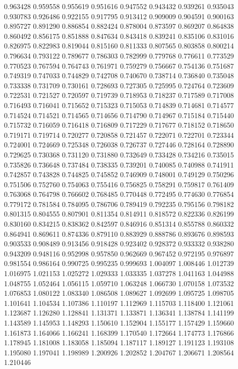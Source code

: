 0.963428
0.959558
0.955619
0.951616
0.947552
0.943432
0.939261
0.935043
0.930783
0.926486
0.922155
0.917795
0.913412
0.909009
0.904591
0.900163
0.895727
0.891290
0.886854
0.882424
0.878004
0.873597
0.869207
0.864838
0.860492
0.856175
0.851888
0.847634
0.843418
0.839241
0.835106
0.831016
0.826975
0.822983
0.819044
0.815160
0.811333
0.807565
0.803858
0.800214
0.796634
0.793122
0.789677
0.786303
0.782999
0.779768
0.776611
0.773529
0.770523
0.767594
0.764743
0.761971
0.759279
0.756667
0.754136
0.751687
0.749319
0.747033
0.744829
0.742708
0.740670
0.738714
0.736840
0.735048
0.733338
0.731709
0.730161
0.728693
0.727305
0.725995
0.724764
0.723609
0.722531
0.721527
0.720597
0.719739
0.718953
0.718237
0.717589
0.717008
0.716493
0.716041
0.715652
0.715323
0.715053
0.714839
0.714681
0.714577
0.714524
0.714521
0.714565
0.714656
0.714790
0.714967
0.715184
0.715440
0.715732
0.716059
0.716418
0.716809
0.717229
0.717677
0.718152
0.718650
0.719171
0.719714
0.720277
0.720858
0.721457
0.722071
0.722701
0.723344
0.724001
0.724669
0.725348
0.726038
0.726737
0.727446
0.728164
0.728890
0.729625
0.730368
0.731120
0.731880
0.732649
0.733428
0.734216
0.735015
0.735826
0.736648
0.737484
0.738335
0.739201
0.740085
0.740988
0.741911
0.742857
0.743828
0.744825
0.745852
0.746909
0.748001
0.749129
0.750296
0.751506
0.752760
0.754063
0.755416
0.756825
0.758291
0.759817
0.761409
0.763068
0.764798
0.766602
0.768485
0.770448
0.772495
0.774630
0.776854
0.779172
0.781584
0.784095
0.786706
0.789419
0.792235
0.795156
0.798182
0.801315
0.804555
0.807901
0.811354
0.814911
0.818572
0.822336
0.826199
0.830160
0.834215
0.838362
0.842597
0.846916
0.851314
0.855788
0.860332
0.864941
0.869611
0.874336
0.879110
0.883929
0.888786
0.893676
0.898593
0.903533
0.908489
0.913456
0.918428
0.923402
0.928372
0.933332
0.938280
0.943209
0.948116
0.952998
0.957850
0.962669
0.967452
0.972195
0.976897
0.981554
0.986164
0.990725
0.995235
0.999693
1.004097
1.008446
1.012739
1.016975
1.021153
1.025272
1.029333
1.033335
1.037278
1.041163
1.044988
1.048755
1.052464
1.056115
1.059710
1.063248
1.066730
1.070158
1.073532
1.076853
1.080122
1.083340
1.086508
1.089627
1.092699
1.095725
1.098705
1.101641
1.104534
1.107386
1.110197
1.112969
1.115703
1.118400
1.121061
1.123687
1.126280
1.128841
1.131371
1.133871
1.136341
1.138784
1.141199
1.143589
1.145953
1.148293
1.150610
1.152904
1.155177
1.157429
1.159660
1.161873
1.164066
1.166241
1.168399
1.170540
1.172664
1.174773
1.176866
1.178945
1.181008
1.183058
1.185094
1.187117
1.189127
1.191123
1.193108
1.195080
1.197041
1.198989
1.200926
1.202852
1.204767
1.206671
1.208564
1.210446

